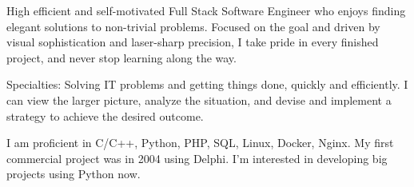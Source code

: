 
\begin{cvparagraph}

High efficient and self-motivated Full Stack Software Engineer who enjoys
finding elegant solutions to non-trivial problems. Focused on the goal and
driven by visual sophistication and laser-sharp precision, I take pride in
every finished project, and never stop learning along the way.

Specialties: Solving IT problems and getting things done, quickly and efficiently.
I can view the larger picture, analyze the situation, and devise and implement a
strategy to achieve the desired outcome.

I am proficient in C/C++, Python, PHP, SQL, Linux, Docker, Nginx. My first commercial
project was in 2004 using Delphi. I'm interested in developing big projects using
Python now.

\end{cvparagraph}
